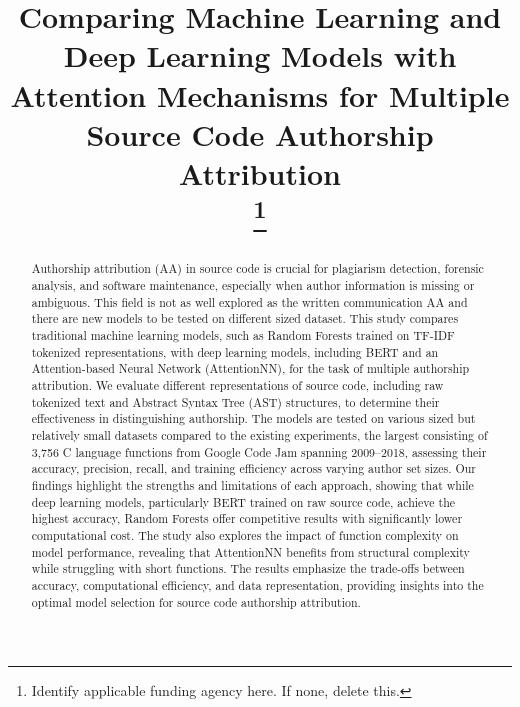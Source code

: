 \documentclass[conference]{IEEEtran}
\begin{document}
\title{Comparing Machine Learning and Deep Learning Models with Attention Mechanisms for Multiple Source Code Authorship Attribution\\
\thanks{Identify applicable funding agency here. If none, delete this.}
}

\author{
\and
{}
}

\maketitle

\begin{abstract}
    Authorship attribution (AA) in source code is crucial for plagiarism detection, 
    forensic analysis, and software maintenance, especially when author 
    information is missing or ambiguous. This field is not as well explored 
    as the written communication AA and there are new models to be tested 
    on different sized dataset. This study compares traditional 
    machine learning models, such as Random Forests trained on TF-IDF 
    tokenized representations, with deep learning models, including BERT 
    and an Attention-based Neural Network (AttentionNN), for the task of 
    multiple authorship attribution. We evaluate different representations 
    of source code, including raw tokenized text and Abstract Syntax Tree (AST) 
    structures, to determine their effectiveness in distinguishing authorship. 
    The models are tested on various sized but relatively small datasets compared to the existing experiments, 
    the largest consisting of 3,756 C language functions from 
    Google Code Jam spanning 2009–2018, assessing their accuracy, precision, 
    recall, and training efficiency across varying author set sizes. 
    Our findings highlight the strengths and limitations of each approach, 
    showing that while deep learning models, particularly BERT trained on 
    raw source code, achieve the highest accuracy, Random Forests offer 
    competitive results with significantly lower computational cost. 
    The study also explores the impact of function complexity on model 
    performance, revealing that AttentionNN benefits from structural 
    complexity while struggling with short functions. The results emphasize 
    the trade-offs between accuracy, computational efficiency, and data 
    representation, providing insights into the optimal model selection 
    for source code authorship attribution. 
\end{abstract}
\end{document}
